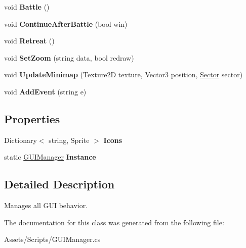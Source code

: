 \begin{DoxyCompactItemize}
\item 
\hypertarget{class_g_u_i_manager_a1c12ab36da3b823ceb208114ce9edc9b}{}void {\bfseries Battle} ()\label{class_g_u_i_manager_a1c12ab36da3b823ceb208114ce9edc9b}

\item 
\hypertarget{class_g_u_i_manager_a4bd22b59af2e4c051f9af3337dd579e3}{}void {\bfseries Continue\+After\+Battle} (bool win)\label{class_g_u_i_manager_a4bd22b59af2e4c051f9af3337dd579e3}

\item 
\hypertarget{class_g_u_i_manager_a455d5c7d49d5dcfb26a20f80751612a6}{}void {\bfseries Retreat} ()\label{class_g_u_i_manager_a455d5c7d49d5dcfb26a20f80751612a6}

\item 
\hypertarget{class_g_u_i_manager_ad1df2b755b7b7c1249f986873d491ca7}{}void {\bfseries Set\+Zoom} (string data, bool redraw)\label{class_g_u_i_manager_ad1df2b755b7b7c1249f986873d491ca7}

\item 
\hypertarget{class_g_u_i_manager_ab91cc1b74b3a9adf1586a296e46db4a9}{}void {\bfseries Update\+Minimap} (Texture2\+D texture, Vector3 position, \hyperlink{class_sector}{Sector} sector)\label{class_g_u_i_manager_ab91cc1b74b3a9adf1586a296e46db4a9}

\item 
\hypertarget{class_g_u_i_manager_a1c171896d867f015ed4002d56a9d79b2}{}void {\bfseries Add\+Event} (string e)\label{class_g_u_i_manager_a1c171896d867f015ed4002d56a9d79b2}

\end{DoxyCompactItemize}
\subsection*{Properties}
\begin{DoxyCompactItemize}
\item 
\hypertarget{class_g_u_i_manager_aee34e0da2e515684c326876cab67f91e}{}Dictionary$<$ string, Sprite $>$ {\bfseries Icons}\label{class_g_u_i_manager_aee34e0da2e515684c326876cab67f91e}

\item 
\hypertarget{class_g_u_i_manager_a762dcc2bd2a9b6cf6918feb5fceee6c1}{}static \hyperlink{class_g_u_i_manager}{G\+U\+I\+Manager} {\bfseries Instance}\label{class_g_u_i_manager_a762dcc2bd2a9b6cf6918feb5fceee6c1}

\end{DoxyCompactItemize}


\subsection{Detailed Description}
Manages all G\+U\+I behavior. 



The documentation for this class was generated from the following file\+:\begin{DoxyCompactItemize}
\item 
Assets/\+Scripts/G\+U\+I\+Manager.\+cs\end{DoxyCompactItemize}
